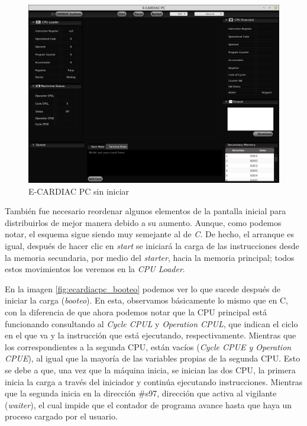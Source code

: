 \documentclass[letterpaper,12pt,oneside]{book}
\begin{document}
			
			\begin{figure}[h]		
				\centering
				\includegraphics[scale=0.36]{media/Paralela/ecaridacpc_sininiciar.png}
				\caption{ E-CARDIAC PC sin iniciar}
				\label{fig:ecaridacpc_sininiciar}
			\end{figure}	

			También fue necesario reordenar algunos elementos de la pantalla inicial para distribuirlos de mejor manera debido
			a su aumento. Aunque, como podemos notar, el esquema sigue siendo muy semejante al de \textit{C}. De hecho, el 
			arranque es igual, después de hacer clic en
			\textit{start} se iniciará la carga de las instrucciones desde la memoria secundaria, por medio del \textit{starter}, hacia la memoria 
			principal; todos estos movimientos los veremos en la \textit{CPU Loader}.

   
			En la imagen \ref{fig:ecardiacpc_booteo} podemos ver lo que sucede después de iniciar la carga (\textit{booteo}). 
			En esta, observamos básicamente lo mismo que en C, con
			la diferencia de que ahora podemos notar que la CPU principal está funcionando  consultando al \textit{Cycle CPUL} y
			\textit{Operation CPUL}, que indican el ciclo en el que va y la instrucción que está ejecutando, respectivamente. 
			Mientras que los correspondientes
			a la segunda CPU, están vacíos (\textit{Cycle CPUE y Operation CPUE}), al igual que la mayoría de las variables propias de la segunda CPU. 
			Esto 
			se debe a que, una vez que la máquina inicia, se inician
			las dos CPU, la primera inicia la carga  a través del iniciador y continúa ejecutando instrucciones. Mientras que la segunda inicia
			en la dirección \#s97, dirección que activa al vigilante (\textit{waiter}),
			  el cual impide que el contador de programa avance hasta que haya
			un proceso cargado por el usuario.
\end{document}
